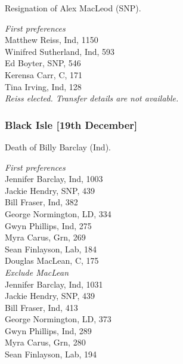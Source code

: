 \documentclass[a4paper,openany,10pt]{book}
\begin{document}
Resignation of Alex MacLeod (SNP).



\emph{First preferences}\\
Matthew Reiss, Ind, 1150\\
Winifred Sutherland, Ind, 593\\
Ed Boyter, SNP, 546\\
Kerensa Carr, C, 171\\
Tina Irving, Ind, 128\\



\emph{Reiss elected.  Transfer details are not available.}

\subsubsection*{Black Isle \hspace*{\fill}\nolinebreak[1]%
\enspace\hspace*{\fill}
[19th December]}


Death of Billy Barclay (Ind).



\emph{First preferences}\\
Jennifer Barclay, Ind, 1003\\
Jackie Hendry, SNP, 439\\
Bill Fraser, Ind, 382\\
George Normington, LD, 334\\
Gwyn Phillips, Ind, 275\\
Myra Carus, Grn, 269\\
Sean Finlayson, Lab, 184\\
Douglas MacLean, C, 175\\




\emph{Exclude MacLean}\\
Jennifer Barclay, Ind, 1031\\
Jackie Hendry, SNP, 439\\
Bill Fraser, Ind, 413\\
George Normington, LD, 373\\
Gwyn Phillips, Ind, 289\\
Myra Carus, Grn, 280\\
Sean Finlayson, Lab, 194\\
\end{document}

